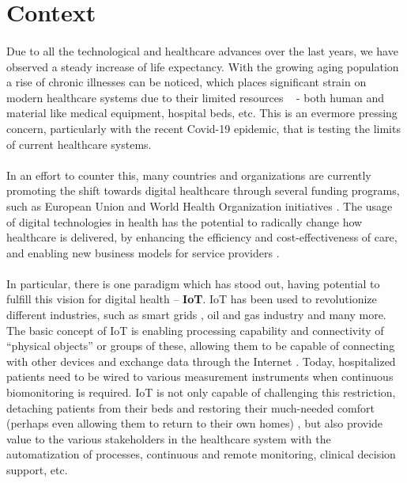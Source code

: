 

\section{Context}

\paragraph{} Due to all the technological and healthcare advances over the last years, we have observed a steady increase of life expectancy. With the growing aging population a rise of chronic illnesses can be noticed, which places significant strain on modern healthcare systems due to their limited resources ~\cite{Koen2019, Redondi2013} - both human and material like medical equipment, hospital beds, etc. This is an evermore pressing concern, particularly with the recent Covid-19 epidemic, that is testing the limits of current healthcare systems. 

\paragraph{} In an effort to counter this, many countries and organizations are currently promoting the shift towards digital healthcare through several funding programs, such as European Union \cite{EuropeanUnion2021} and World Health Organization initiatives \cite{WorldHealthOrganization2020}. The usage of digital technologies in health has the potential to radically change how healthcare is delivered, by enhancing the efficiency and cost-effectiveness of care, and enabling new business models for service providers \cite{WorldHealthOrganization2020}.

\paragraph{} In particular, there is one paradigm which has stood out, having potential to fulfill this vision for digital health -- \textbf{\acf{IoT}}. \acs{IoT} has been used to revolutionize different industries, such as smart grids \cite{Faria2020}, oil and gas industry \cite{Shoja2018} and many more. The basic concept of \acs{IoT} is enabling processing capability and connectivity of ``physical objects'' or groups of these, allowing them to be capable of connecting with other devices and exchange data through the Internet \cite{gershenfeld2004internet}. Today, hospitalized patients need to be wired to various measurement instruments when continuous biomonitoring is required. \acs{IoT} is not only capable of challenging this restriction, detaching patients from their beds and restoring their much-needed comfort (perhaps even allowing them to return to their own homes) \cite{Darwish2011}, but also provide value to the various stakeholders in the healthcare system with the automatization of processes, continuous and remote monitoring, clinical decision support, etc.

